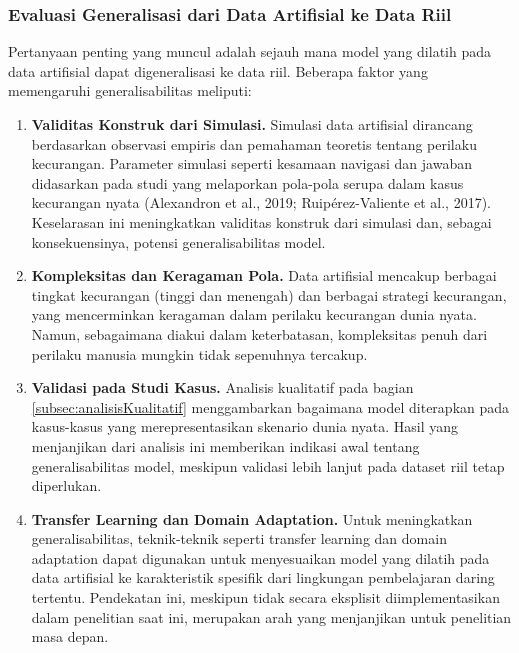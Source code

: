\subsubsection{Evaluasi Generalisasi dari Data Artifisial ke Data Riil}

Pertanyaan penting yang muncul adalah sejauh mana model yang dilatih pada data artifisial dapat digeneralisasi ke data riil. Beberapa faktor yang memengaruhi generalisabilitas meliputi:

\begin{enumerate}
    \item \textbf{Validitas Konstruk dari Simulasi.} Simulasi data artifisial dirancang berdasarkan observasi empiris dan pemahaman teoretis tentang perilaku kecurangan. Parameter simulasi seperti kesamaan navigasi dan jawaban didasarkan pada studi yang melaporkan pola-pola serupa dalam kasus kecurangan nyata (Alexandron et al., 2019; Ruipérez-Valiente et al., 2017). Keselarasan ini meningkatkan validitas konstruk dari simulasi dan, sebagai konsekuensinya, potensi generalisabilitas model.
    
    \item \textbf{Kompleksitas dan Keragaman Pola.} Data artifisial mencakup berbagai tingkat kecurangan (tinggi dan menengah) dan berbagai strategi kecurangan, yang mencerminkan keragaman dalam perilaku kecurangan dunia nyata. Namun, sebagaimana diakui dalam keterbatasan, kompleksitas penuh dari perilaku manusia mungkin tidak sepenuhnya tercakup.
    
    \item \textbf{Validasi pada Studi Kasus.} Analisis kualitatif pada bagian \ref{subsec:analisisKualitatif} menggambarkan bagaimana model diterapkan pada kasus-kasus yang merepresentasikan skenario dunia nyata. Hasil yang menjanjikan dari analisis ini memberikan indikasi awal tentang generalisabilitas model, meskipun validasi lebih lanjut pada dataset riil tetap diperlukan.
    
    \item \textbf{Transfer Learning dan Domain Adaptation.} Untuk meningkatkan generalisabilitas, teknik-teknik seperti transfer learning dan domain adaptation dapat digunakan untuk menyesuaikan model yang dilatih pada data artifisial ke karakteristik spesifik dari lingkungan pembelajaran daring tertentu. Pendekatan ini, meskipun tidak secara eksplisit diimplementasikan dalam penelitian saat ini, merupakan arah yang menjanjikan untuk penelitian masa depan.
\end{enumerate}

